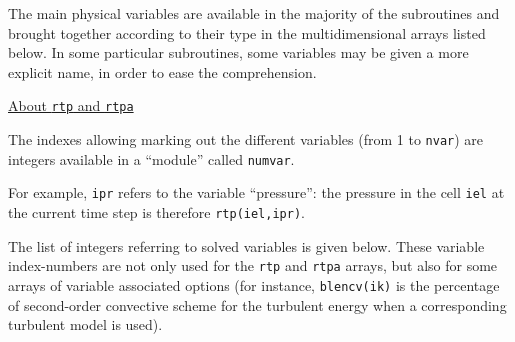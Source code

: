 {{{





The main physical variables are available in the majority of the
subroutines and brought together according to their type in the
multidimensional arrays listed below. In some particular subroutines,
some variables may be given a more explicit name, in order to ease the
comprehension.






\bigskip

\underline{About \texttt{rtp} and \texttt{rtpa}}

The indexes allowing marking out the different variables (from 1 to
\texttt{nvar}) are integers available in a ``module'' called
\texttt{numvar}.

For example, \texttt{ipr} refers to the variable ``pressure'':
the pressure in the cell \texttt{iel} at the current time step is
therefore \texttt{rtp(iel,ipr)}.

The list of integers referring to solved variables is given below. These
variable index-numbers are not only used for the \texttt{rtp} and
\texttt{rtpa} arrays, but also for some arrays of variable associated options
(for instance, \texttt{blencv(ik)} is the percentage of second-order
convective scheme for the turbulent energy
when a corresponding turbulent model is used).

}}}
